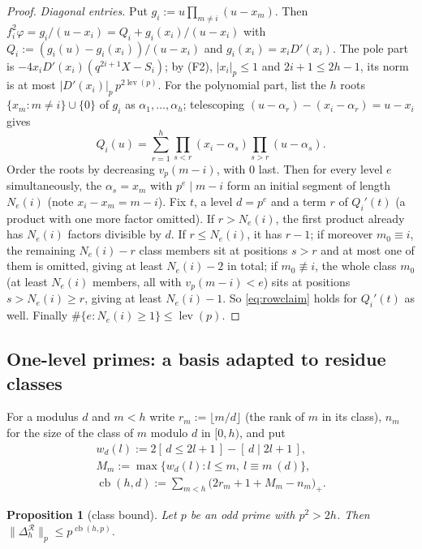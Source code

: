 \documentclass[11pt]{amsart}
\newtheorem{proposition}[theorem]{Proposition}
\theoremstyle{definition}
\theoremstyle{remark}
\numberwithin{equation}{section}
\newcommand{\cR}{\mathcal{R}}
\newcommand{\ind}[1]{[\,#1\,]}
\newcommand{\lev}{\operatorname{lev}}
\newcommand{\cb}{\operatorname{cb}}
\begin{document}
\begin{proof}
\emph{Diagonal entries.} Put $g_i:=u\prod_{m\ne i}(u-x_m)$. Then $f_i^2\varphi=g_i/(u-x_i)=Q_i+g_i(x_i)/(u-x_i)$ with
$Q_i:=(g_i(u)-g_i(x_i))/(u-x_i)$ and $g_i(x_i)=x_iD'(x_i)$. The pole part is $-4x_iD'(x_i)(q^{2i+1}X-S_i)$; by (F2),
$|x_i|_p\le1$ and $2i+1\le2h-1$, its norm is at most $|D'(x_i)|_p\,p^{2\lev(p)}$. For the polynomial part, list the
$h$ roots $\{x_m:m\ne i\}\cup\{0\}$ of $g_i$ as $\alpha_1,\dots,\alpha_h$; telescoping
$(u-\alpha_r)-(x_i-\alpha_r)=u-x_i$ gives
\[
  Q_i(u)=\sum_{r=1}^{h}\prod_{s<r}(x_i-\alpha_s)\prod_{s>r}(u-\alpha_s).
\]
Order the roots by decreasing $v_p(m-i)$, with $0$ last. Then for every level $e$ simultaneously, the $\alpha_s=x_m$ with
$p^e\mid m-i$ form an initial segment of length $N_e(i)$ (note $x_i-x_m=m-i$). Fix $t$, a level $d=p^e$ and a term
$r$ of $Q_i'(t)$ (a product with one more factor omitted). If $r>N_e(i)$, the first product already has $N_e(i)$
factors divisible by $d$. If $r\le N_e(i)$, it has $r-1$; if moreover $m_0\equiv i$, the remaining $N_e(i)-r$ class
members sit at positions $s>r$ and at most one of them is omitted, giving at least $N_e(i)-2$ in total; if
$m_0\not\equiv i$, the whole class $m_0$ (at least $N_e(i)$ members, all with $v_p(m-i)<e$) sits at positions
$s>N_e(i)\ge r$, giving at least $N_e(i)-1$. So \eqref{eq:rowclaim} holds for $Q_i'(t)$ as well. Finally
$\#\{e:N_e(i)\ge1\}\le\lev(p)$.
\end{proof}

\subsection{One-level primes: a basis adapted to residue classes}\label{sec:classbound}
For a modulus $d$ and $m<h$ write $r_m:=\lfloor m/d\rfloor$ (the rank of $m$ in its class), $n_m$ for the size of the
class of $m$ modulo $d$ in $[0,h)$, and put
\begin{gather*}
  w_d(l):=2\ind{d\le2l+1}-\ind{d\mid2l+1},\\
  M_m:=\max\{w_d(l):l\le m,\ l\equiv m\ (d)\},\\
  \cb(h,d):=\sum_{m<h}\bigl(2r_m+1+M_m-n_m\bigr)_+ .
\end{gather*}

\begin{proposition}[class bound]\label{prop:classbound}
Let $p$ be an odd prime with $p^2>2h$. Then $\|\Delta^{\cR}_h\|_p\le p^{\cb(h,p)}$.
\end{proposition}
\end{document}
